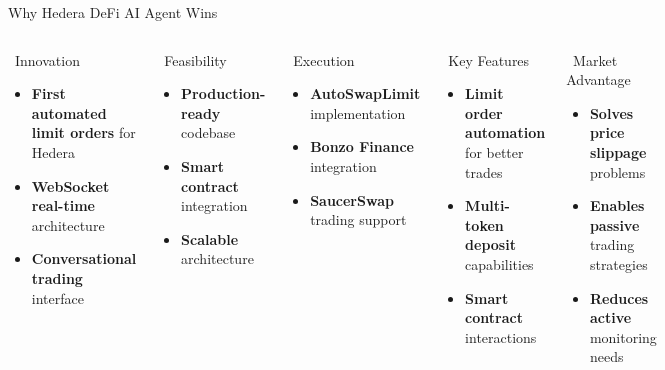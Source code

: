 \documentclass[aspectratio=169]{beamer}
\begin{document}
\begin{frame}{Why Hedera DeFi AI Agent Wins}
\begin{columns}
\begin{block}{\faLightbulb\ Innovation}
\begin{itemize}
\item \textbf{First automated limit orders} for Hedera
\item \textbf{WebSocket real-time} architecture
\item \textbf{Conversational trading} interface
\end{itemize}
\end{block}

\begin{block}{\faCogs\ Feasibility}
\begin{itemize}
\item \textbf{Production-ready} codebase
\item \textbf{Smart contract} integration
\item \textbf{Scalable} architecture
\end{itemize}
\end{block}

\begin{block}{\faRocket\ Execution}
\begin{itemize}
\item \textbf{AutoSwapLimit} implementation
\item \textbf{Bonzo Finance} integration
\item \textbf{SaucerSwap} trading support
\end{itemize}
\end{block}

\begin{block}{\faPlug\ Key Features}
\begin{itemize}
\item \textbf{Limit order automation} for better trades
\item \textbf{Multi-token deposit} capabilities
\item \textbf{Smart contract} interactions
\end{itemize}
\end{block}

\begin{block}{\faTrophy\ Market Advantage}
\begin{itemize}
\item \textbf{Solves price slippage} problems
\item \textbf{Enables passive} trading strategies
\item \textbf{Reduces active} monitoring needs
\end{itemize}
\end{block}


\end{columns}
\end{frame}
\end{document}
